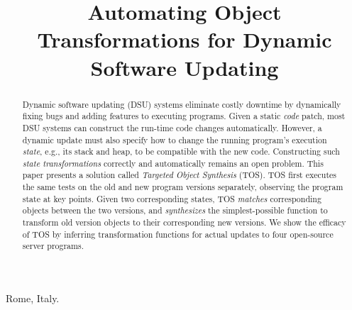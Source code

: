 \documentclass[natbib]{sigplanconf}
\newcommand{\TOSAcronym}{\emph{Targeted Object Synthesis} (TOS)\xspace}
\newcommand{\TOS}{TOS\xspace}
\begin{document}
 {Rome, Italy.}


\title{Automating Object Transformations for Dynamic Software Updating
    }






\maketitle

\begin{abstract}
  Dynamic software updating (DSU) systems eliminate costly downtime by
  dynamically fixing bugs and adding features to executing programs.
  Given a static \emph{code} patch, most DSU systems can construct the
  run-time code changes automatically.  However, a dynamic update must
  also specify how to change the running program's execution
  \emph{state}, e.g., its stack and heap, to be compatible with the
  new code.  Constructing such \emph{state transformations} correctly
  and automatically remains an open problem.  This paper presents a
  solution called \TOSAcronym.  \TOS first executes the same tests on
  the old and new program versions separately, observing the program
  state at key points.  Given two corresponding states, \TOS
  \emph{matches} corresponding objects between the two versions, and
  \emph{synthesizes} the simplest-possible function to transform old
  version objects to their corresponding new versions.  We show the
  efficacy of \TOS by inferring transformation functions for actual
  updates to four open-source server programs.
\end{abstract}
\end{document}
